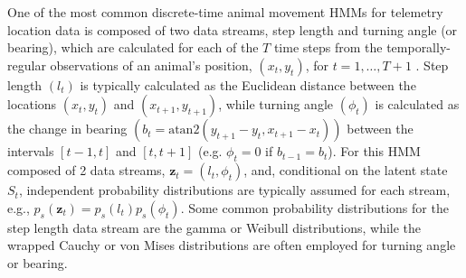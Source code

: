 \documentclass[12pt]{article}
\begin{document}
One of the most common discrete-time animal movement HMMs for telemetry location data is composed of two data streams, step length and turning angle (or bearing), which are calculated for each of the $T$ time steps from the temporally-regular observations of an animal's position, $(x_t,y_t)$, for $t=1,\ldots,T+1$ \citep[e.g.][]{MoralesEtAl2004,LangrockEtAl2012,McClintockEtAl2012}. Step length $(l_t)$ is typically calculated as the Euclidean distance between the locations $(x_t,y_t)$ and $(x_{t+1},y_{t+1})$, while turning angle $(\phi_t)$ is calculated as the change in bearing $\left(b_t=\text{atan2}(y_{t+1}-y_t,x_{t+1}-x_t)\right)$ between the intervals $[t-1,t]$ and $[t,t+1]$ (e.g. $\phi_t=0$ if $b_{t-1}=b_t$). For this HMM composed of 2 data streams, ${\mathbf z}_t=(l_t,\phi_t)$, and, conditional on the latent state $S_t$, independent probability distributions are typically assumed for each stream, e.g., $p_s({\mathbf z}_t)=p_s(l_t)p_s(\phi_t)$. Some common probability distributions for the step length data stream are the gamma or Weibull distributions, while the wrapped Cauchy or von Mises distributions are often employed for turning angle or bearing.
\end{document}
